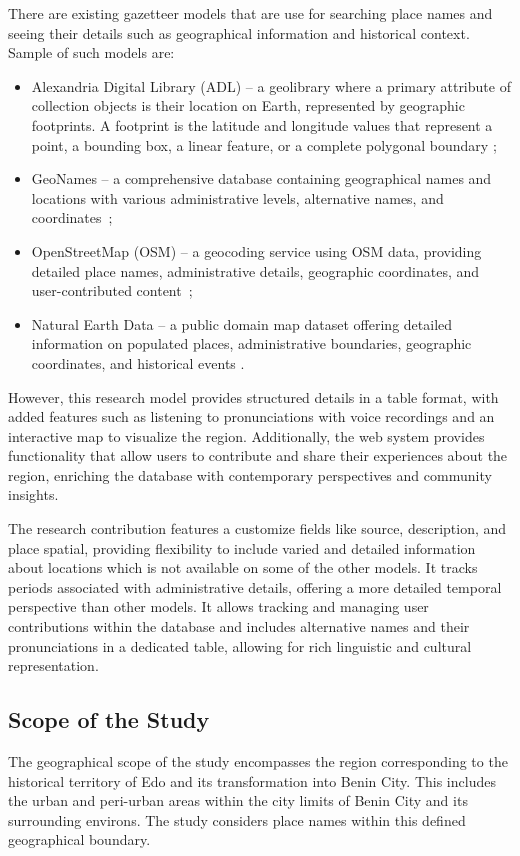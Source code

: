 There are existing gazetteer models that are use for searching place names and seeing their details such as geographical information and historical context. Sample of such models are: 
\begin{itemize}
\item Alexandria Digital Library (ADL) -- a geolibrary where a primary attribute of collection objects is their location on Earth, represented by geographic footprints. A footprint is the latitude and longitude values that represent a point, a bounding box, a linear feature, or a complete polygonal boundary \cite{hill1999implementation};
\item GeoNames -- a comprehensive database containing geographical names and locations with various administrative levels, alternative names, and coordinates~\cite{geonames};
\item OpenStreetMap (OSM) -- a geocoding service using OSM data, providing detailed place names, administrative details, geographic coordinates, and user-contributed content~\cite{osm_geonames_2016}; 
\item Natural Earth Data -- a public domain map dataset offering detailed information on populated places, administrative boundaries, geographic coordinates, and historical events \cite{natural_earth_data}. 
\end{itemize}
However, this research model provides structured details in a table format, with added features such as listening to pronunciations with voice recordings and an interactive map to visualize the region. Additionally, the web system provides functionality that allow users to contribute and share their experiences about the region, enriching the database with contemporary perspectives and community insights.

The research contribution features a customize fields like source, description, and place spatial, providing flexibility to include varied and detailed information about locations which is not available on some of the other models. It tracks periods associated with administrative details, offering a more detailed temporal perspective than other models. It allows tracking and managing user contributions within the database and includes alternative names and their pronunciations in a dedicated table, allowing for rich linguistic and cultural representation.

\subsection{Scope of the Study}
The geographical scope of the study encompasses the region corresponding to the historical territory of Edo and its transformation into Benin City. This includes the urban and peri-urban areas within the city limits of Benin City and its surrounding environs. The study considers place names within this defined geographical boundary.


